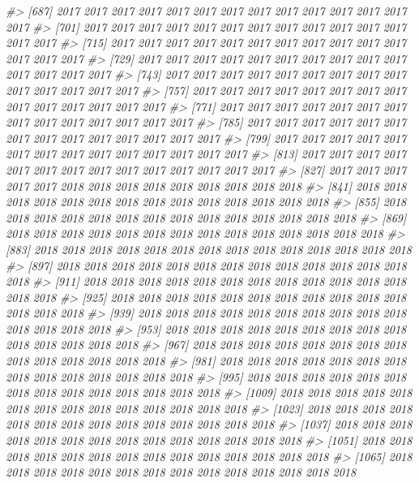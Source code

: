 \documentclass[
]{article}
\newenvironment{Shaded}{\begin{snugshade}}{\end{snugshade}}
\newcommand{\CommentTok}[1]{\textcolor[rgb]{0.56,0.35,0.01}{\textit{#1}}}
\begin{document}
\begin{Shaded}
\begin{Highlighting}[]
\CommentTok{#>  [687] 2017 2017 2017 2017 2017 2017 2017 2017 2017 2017 2017 2017 2017 2017}
\CommentTok{#>  [701] 2017 2017 2017 2017 2017 2017 2017 2017 2017 2017 2017 2017 2017 2017}
\CommentTok{#>  [715] 2017 2017 2017 2017 2017 2017 2017 2017 2017 2017 2017 2017 2017 2017}
\CommentTok{#>  [729] 2017 2017 2017 2017 2017 2017 2017 2017 2017 2017 2017 2017 2017 2017}
\CommentTok{#>  [743] 2017 2017 2017 2017 2017 2017 2017 2017 2017 2017 2017 2017 2017 2017}
\CommentTok{#>  [757] 2017 2017 2017 2017 2017 2017 2017 2017 2017 2017 2017 2017 2017 2017}
\CommentTok{#>  [771] 2017 2017 2017 2017 2017 2017 2017 2017 2017 2017 2017 2017 2017 2017}
\CommentTok{#>  [785] 2017 2017 2017 2017 2017 2017 2017 2017 2017 2017 2017 2017 2017 2017}
\CommentTok{#>  [799] 2017 2017 2017 2017 2017 2017 2017 2017 2017 2017 2017 2017 2017 2017}
\CommentTok{#>  [813] 2017 2017 2017 2017 2017 2017 2017 2017 2017 2017 2017 2017 2017 2017}
\CommentTok{#>  [827] 2017 2017 2017 2017 2017 2018 2018 2018 2018 2018 2018 2018 2018 2018}
\CommentTok{#>  [841] 2018 2018 2018 2018 2018 2018 2018 2018 2018 2018 2018 2018 2018 2018}
\CommentTok{#>  [855] 2018 2018 2018 2018 2018 2018 2018 2018 2018 2018 2018 2018 2018 2018}
\CommentTok{#>  [869] 2018 2018 2018 2018 2018 2018 2018 2018 2018 2018 2018 2018 2018 2018}
\CommentTok{#>  [883] 2018 2018 2018 2018 2018 2018 2018 2018 2018 2018 2018 2018 2018 2018}
\CommentTok{#>  [897] 2018 2018 2018 2018 2018 2018 2018 2018 2018 2018 2018 2018 2018 2018}
\CommentTok{#>  [911] 2018 2018 2018 2018 2018 2018 2018 2018 2018 2018 2018 2018 2018 2018}
\CommentTok{#>  [925] 2018 2018 2018 2018 2018 2018 2018 2018 2018 2018 2018 2018 2018 2018}
\CommentTok{#>  [939] 2018 2018 2018 2018 2018 2018 2018 2018 2018 2018 2018 2018 2018 2018}
\CommentTok{#>  [953] 2018 2018 2018 2018 2018 2018 2018 2018 2018 2018 2018 2018 2018 2018}
\CommentTok{#>  [967] 2018 2018 2018 2018 2018 2018 2018 2018 2018 2018 2018 2018 2018 2018}
\CommentTok{#>  [981] 2018 2018 2018 2018 2018 2018 2018 2018 2018 2018 2018 2018 2018 2018}
\CommentTok{#>  [995] 2018 2018 2018 2018 2018 2018 2018 2018 2018 2018 2018 2018 2018 2018}
\CommentTok{#> [1009] 2018 2018 2018 2018 2018 2018 2018 2018 2018 2018 2018 2018 2018 2018}
\CommentTok{#> [1023] 2018 2018 2018 2018 2018 2018 2018 2018 2018 2018 2018 2018 2018 2018}
\CommentTok{#> [1037] 2018 2018 2018 2018 2018 2018 2018 2018 2018 2018 2018 2018 2018 2018}
\CommentTok{#> [1051] 2018 2018 2018 2018 2018 2018 2018 2018 2018 2018 2018 2018 2018 2018}
\CommentTok{#> [1065] 2018 2018 2018 2018 2018 2018 2018 2018 2018 2018 2018 2018 2018 2018}

\end{Highlighting}
\end{Shaded}
\end{document}
